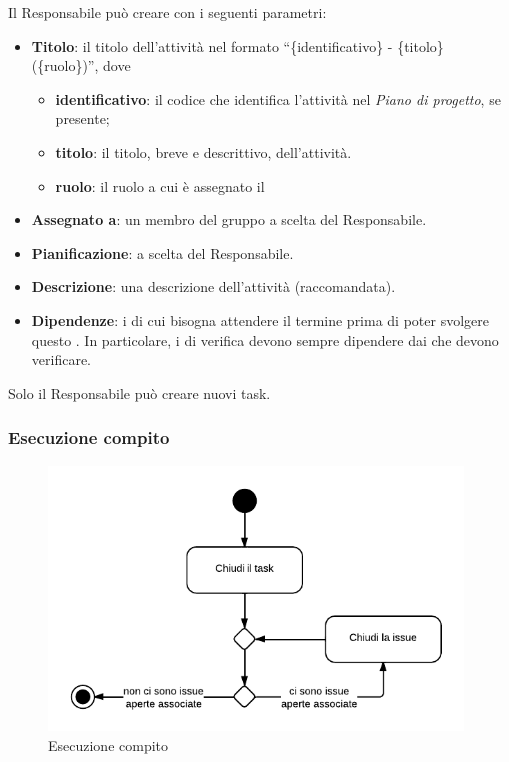 Il Responsabile può creare  con i seguenti parametri:
\begin{itemize}
 \item \textbf{Titolo}: il titolo dell'attività nel formato ``\{identificativo\} - \{titolo\} (\{ruolo\})'', dove
	\begin{itemize}
		\item \textbf{identificativo}: il codice che identifica l'attività nel \emph{Piano di progetto}, se presente;
		\item \textbf{titolo}: il titolo, breve e descrittivo, dell'attività.
		\item \textbf{ruolo}: il ruolo a cui è assegnato il 
	\end{itemize}
 \item \textbf{Assegnato a}: un membro del gruppo a scelta del Responsabile.
 \item \textbf{Pianificazione}: a scelta del Responsabile.
 \item \textbf{Descrizione}: una descrizione dell'attività (raccomandata).
 \item \textbf{Dipendenze}: i  di cui bisogna attendere il termine prima di poter svolgere questo . In particolare, i  di verifica devono sempre dipendere dai  che devono verificare.
\end{itemize}

Solo il Responsabile può creare nuovi task.

\subsubsection{Esecuzione compito}

\begin{figure}[H]
    \centering
    \includegraphics[width=11cm]{uml-processi/esecuzione_compito.png}
    \caption{Esecuzione compito}
\end{figure}

